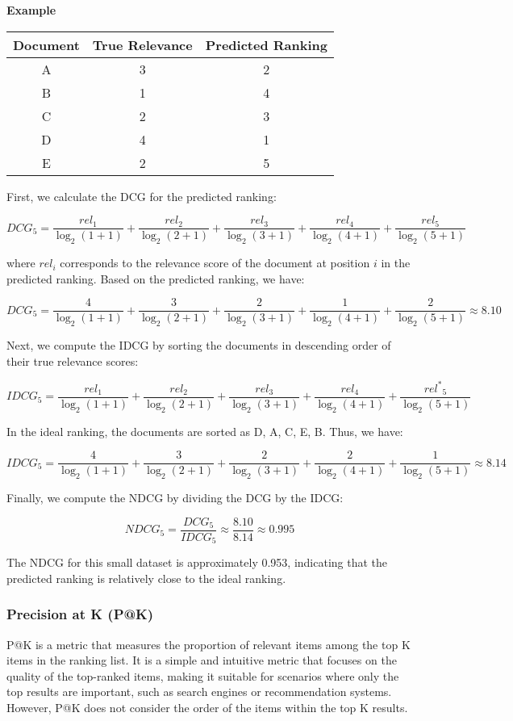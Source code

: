 \documentclass[12pt]{article}
\begin{document}
\textbf{Example}

\begin{table}[h]
\centering
\begin{tabular}{c|c|c}
\textbf{Document} & \textbf{True Relevance} & \textbf{Predicted Ranking} \\
\hline
A & 3 & 2 \\
B & 1 & 4 \\
C & 2 & 3 \\
D & 4 & 1 \\
E & 2 & 5 \\
\end{tabular}
\end{table}

First, we calculate the DCG for the predicted ranking:

$$DCG_5 = \frac{rel_1}{\log_2{(1 + 1)}} + \frac{rel_2}{\log_2{(2 + 1)}} + \frac{rel_3}{\log_2{(3 + 1)}} + \frac{rel_4}{\log_2{(4 + 1)}} + \frac{rel_5}{\log_2{(5 + 1)}}$$

where $rel_i$ corresponds to the relevance score of the document at position $i$ in the predicted ranking. Based on the predicted ranking, we have:

$$DCG_5 = \frac{4}{\log_2{(1 + 1)}} + \frac{3}{\log_2{(2 + 1)}} + \frac{2}{\log_2{(3 + 1)}} + \frac{1}{\log_2{(4 + 1)}} + \frac{2}{\log_2{(5 + 1)}} \approx 8.10$$

Next, we compute the IDCG by sorting the documents in descending order of their true relevance scores:

$$IDCG_5 = \frac{rel^{}_1}{\log_2{(1 + 1)}} + \frac{rel^{}_2}{\log_2{(2 + 1)}} + \frac{rel^{}_3}{\log_2{(3 + 1)}} + \frac{rel^{}_4}{\log_2{(4 + 1)}} + \frac{rel^*{}_5}{\log_2{(5 + 1)}}$$

In the ideal ranking, the documents are sorted as D, A, C, E, B. Thus, we have:

$$IDCG_5 = \frac{4}{\log_2{(1 + 1)}} + \frac{3}{\log_2{(2 + 1)}} + \frac{2}{\log_2{(3 + 1)}} + \frac{2}{\log_2{(4 + 1)}} + \frac{1}{\log_2{(5 + 1)}} \approx 8.14$$

Finally, we compute the NDCG by dividing the DCG by the IDCG:

$$NDCG_5 = \frac{DCG_5}{IDCG_5} \approx \frac{8.10}{8.14} \approx 0.995$$

The NDCG for this small dataset is approximately 0.953, indicating that the predicted ranking is relatively close to the ideal ranking.

\subsubsection{Precision at K (P@K)} P@K is a metric that measures the proportion of relevant items among the top K items in the ranking list. It is a simple and intuitive metric that focuses on the quality of the top-ranked items, making it suitable for scenarios where only the top results are important, such as search engines or recommendation systems. However, P@K does not consider the order of the items within the top K results.
\end{document}
